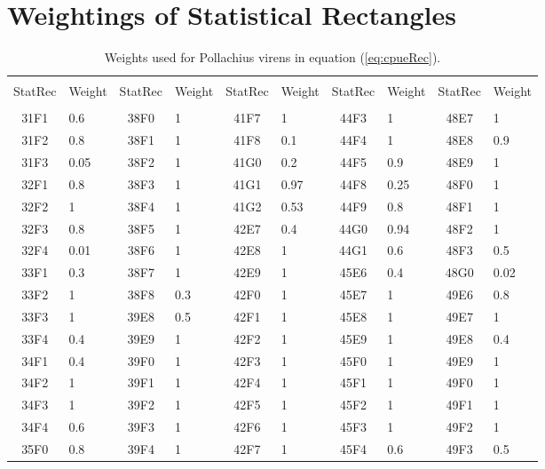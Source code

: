 \documentclass[a4paper 12pt]{article}
\numberwithin{equation}{section}
\begin{document}
 \section{\large Weightings of Statistical Rectangles}
 \label{secAp:weightings}
 \begin{small}
\begin{table}[h!]
\centering
\caption{Weights used for Pollachius virens in equation (\ref{eq:cpueRec}).}
\begin{footnotesize}
\begin{tabular}{clclclclcl}
  \hline \\ [0.3ex]
 StatRec & Weight & StatRec & Weight & StatRec & Weight & StatRec & Weight & StatRec & Weight  \\ [1.0ex]
  \hline \\ [0.3ex]
 31F1 &  0.6 & 38F0 &    1 & 41F7 &    1 & 44F3 &    1 & 48E7 &    1 \\ 
 31F2 &  0.8 & 38F1 &    1 & 41F8 &  0.1 & 44F4 &    1 & 48E8 &  0.9 \\ 
 31F3 & 0.05 & 38F2 &    1 & 41G0 &  0.2 & 44F5 &  0.9 & 48E9 &    1 \\ 
 32F1 &  0.8 & 38F3 &    1 & 41G1 & 0.97 & 44F8 & 0.25 & 48F0 &    1 \\ 
 32F2 &    1 & 38F4 &    1 & 41G2 & 0.53 & 44F9 &  0.8 & 48F1 &    1 \\ 
 32F3 &  0.8 & 38F5 &    1 & 42E7 &  0.4 & 44G0 & 0.94 & 48F2 &    1 \\ 
 32F4 & 0.01 & 38F6 &    1 & 42E8 &    1 & 44G1 &  0.6 & 48F3 &  0.5 \\ 
 33F1 &  0.3 & 38F7 &    1 & 42E9 &    1 & 45E6 &  0.4 & 48G0 & 0.02 \\ 
 33F2 &    1 & 38F8 &  0.3 & 42F0 &    1 & 45E7 &    1 & 49E6 &  0.8 \\ 
 33F3 &    1 & 39E8 &  0.5 & 42F1 &    1 & 45E8 &    1 & 49E7 &    1 \\ 
 33F4 &  0.4 & 39E9 &    1 & 42F2 &    1 & 45E9 &    1 & 49E8 &  0.4 \\ 
 34F1 &  0.4 & 39F0 &    1 & 42F3 &    1 & 45F0 &    1 & 49E9 &    1 \\ 
 34F2 &    1 & 39F1 &    1 & 42F4 &    1 & 45F1 &    1 & 49F0 &    1 \\ 
 34F3 &    1 & 39F2 &    1 & 42F5 &    1 & 45F2 &    1 & 49F1 &    1 \\ 
 34F4 &  0.6 & 39F3 &    1 & 42F6 &    1 & 45F3 &    1 & 49F2 &    1 \\ 
 35F0 &  0.8 & 39F4 &    1 & 42F7 &    1 & 45F4 &  0.6 & 49F3 &  0.5 \\ 

\end{tabular}
\end{footnotesize}
\end{table}
\end{small}
\end{document}
